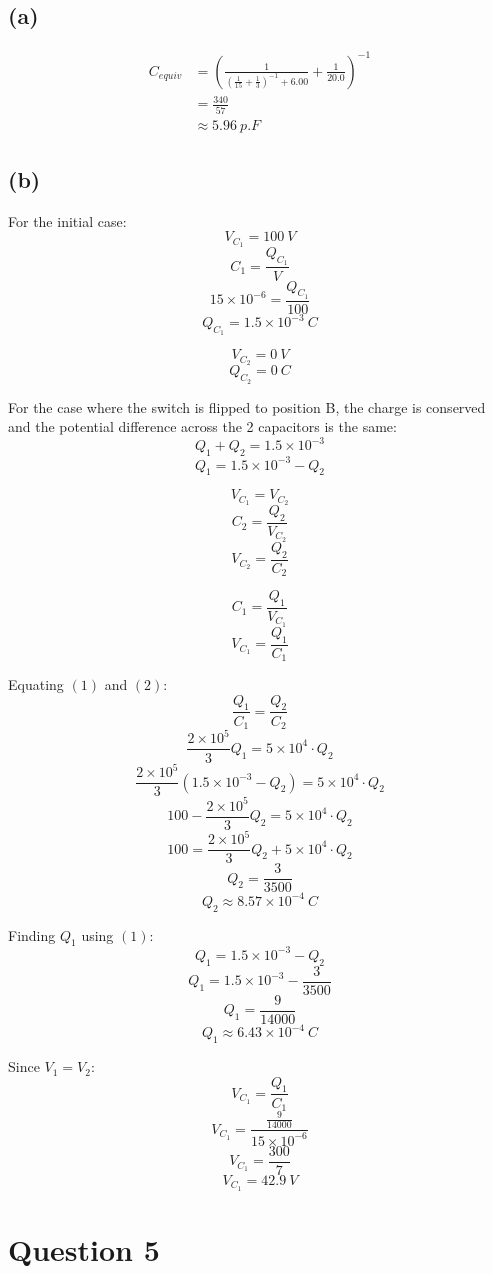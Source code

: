 \documentclass[11pt]{article}
\begin{document}
\subsection{(a)}
\label{sec:orgd73e969}
\begin{align*}
C_{equiv} &= \left( \frac{1}{\left(\frac{1}{15} + \frac{1}{3} \right)^{-1} + 6.00} + \frac{1}{20.0} \right)^{-1} \\
&= \frac{340}{57} \\
&\approx \qty{5.96}{\unit{p.F}}
\end{align*}

\newpage
\subsection{(b)}
\label{sec:orgdf9d9c4}
For the initial case:
\[V_{C_1} = \qty{100}{\unit{V}}\]
\[C_1 = \frac{Q_{C_1}}{V}\]
\[15 \times 10^{-6} = \frac{Q_{C_1}}{100}\]
\[Q_{C_1} = 1.5 \times 10^{-3} \ \unit{C}\]

\[V_{C_2} = \qty{0}{\unit{V}}\]
\[Q_{C_2} = \qty{0}{\unit{C}}\]

For the case where the switch is flipped to position B, the charge is conserved and the potential difference across the 2 capacitors is the same:
\[Q_1 + Q_2 = 1.5 \times 10^{-3}\]
\[Q_1 = 1.5 \times 10^{-3} - Q_2 \tag{1}\]

\[V_{C_1} = V_{C_2}\]
\[C_2 = \frac{Q_2}{V_{C_2}}\]
\[V_{C_2} = \frac{Q_2}{C_2} \tag{2}\]

\[C_1 = \frac{Q_1}{V_{C_1}}\]
\[V_{C_1} = \frac{Q_1}{C_1} \tag{3}\]

\newpage

Equating \((1)\) and \((2)\):
\[\frac{Q_1}{C_1} = \frac{Q_2}{C_2}\]
\[\frac{2 \times 10^{5}}{3}Q_1 = 5 \times 10^{4} \cdot Q_2\]
\[\frac{2 \times 10^{5}}{3} (1.5 \times 10^{-3} - Q_2) = 5 \times 10^{4} \cdot Q_2\]
\[100 - \frac{2 \times 10^{5}}{3} Q_2 = 5 \times 10^{4} \cdot Q_2\]
\[100 = \frac{2 \times 10^{5}}{3} Q_2 + 5 \times 10^{4} \cdot Q_2\]
\[Q_2 = \frac{3}{3500}\]
\[Q_2 \approx 8.57 \times 10^{-4} \ \unit{C}\]

Finding \(Q_1\) using \((1)\):
\[Q_1 = 1.5 \times 10^{-3} - Q_2\]
\[Q_1 = 1.5 \times 10^{-3} - \frac{3}{3500}\]
\[Q_1 = \frac{9}{14000}\]
\[Q_1 \approx 6.43 \times 10^{-4} \ \unit{C}\]

Since \(V_1 = V_2\):
\[V_{C_1} = \frac{Q_1}{C_1}\]
\[V_{C_1} = \frac{\frac{9}{14000}}{15 \times 10^{-6}}\]
\[V_{C_1} = \frac{300}{7}\]
\[V_{C_1} = \qty{42.9}{\unit{V}}\]
\section{Question 5}
\label{sec:orgf2a6e3e}
\end{document}
